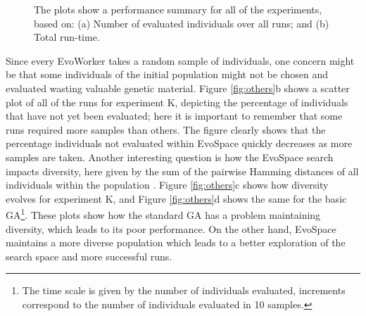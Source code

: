 \begin{figure}[t]
    \centering
    \caption{The plots show a performance summary for all of the experiments, based on:
    (a) Number of evaluated individuals over all runs; and (b) Total run-time.}
    \label{fig:effort}
\end{figure}

Since every EvoWorker takes a random sample of individuals, one concern might be that some individuals of the initial population might
not be chosen and evaluated wasting valuable genetic material.
Figure \ref{fig:others}b shows a scatter plot of all of the runs for experiment K, depicting the percentage of individuals
that have not yet been evaluated; here it is important to remember that some runs required more samples than others.
The figure clearly shows that the percentage individuals not evaluated within EvoSpace quickly decreases as more samples are taken.
Another interesting question is how the EvoSpace search impacts diversity, here given by the sum of the pairwise Hamming distances
of all individuals within the population \cite{diversity}.
Figure \ref{fig:others}c shows how diversity evolves for experiment K, and
Figure \ref{fig:others}d shows the same for the basic GA\footnote{The time scale is given by
the number of individuals evaluated, increments correspond to the number of individuals evaluated in 10 samples.}.
These plots show how the standard GA has a problem maintaining diversity, which leads to its poor performance.
On the other hand, EvoSpace maintains a more diverse population which leads to a better exploration of the search space and more successful runs.

